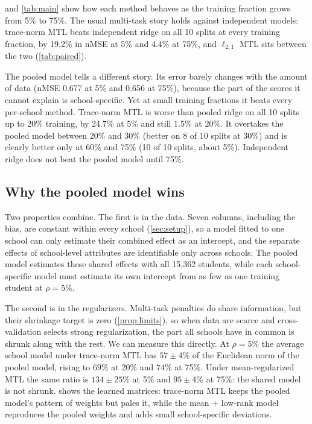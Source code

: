 


 and \cref{tab:main} show how each method behaves as the training fraction grows from 5\% to 75\%. The usual multi-task story holds against independent models: trace-norm MTL beats independent ridge on all 10 splits at every training fraction, by 19.2\% in nMSE at 5\% and 4.4\% at 75\%, and $\ell_{2,1}$ MTL sits between the two (\cref{tab:paired}).

The pooled model tells a different story. Its error barely changes with the amount of data (nMSE 0.677 at 5\% and 0.656 at 75\%), because the part of the scores it cannot explain is school-specific. Yet at small training fractions it beats every per-school method. Trace-norm MTL is worse than pooled ridge on all 10 splits up to 20\% training, by 24.7\% at 5\% and still 1.5\% at 20\%. It overtakes the pooled model between 20\% and 30\% (better on 8 of 10 splits at 30\%) and is clearly better only at 60\% and 75\% (10 of 10 splits, about 5\%). Independent ridge does not beat the pooled model until 75\%.

\subsection{Why the pooled model wins}
\label{sec:res-why}

Two properties combine. The first is in the data. Seven columns, including the bias, are constant within every school (\cref{sec:setup}), so a model fitted to one school can only estimate their combined effect as an intercept, and the separate effects of school-level attributes are identifiable only across schools. The pooled model estimates these shared effects with all 15,362 students, while each school-specific model must estimate its own intercept from as few as one training student at $\rho = 5\%$.

The second is in the regularizers. Multi-task penalties do share information, but their shrinkage target is zero (\cref{prop:limits}), so when data are scarce and cross-validation selects strong regularization, the part all schools have in common is shrunk along with the rest. We can measure this directly. At $\rho = 5\%$ the average school model under trace-norm MTL has $57 \pm 4\%$ of the Euclidean norm of the pooled model, rising to $69\%$ at 20\% and $74\%$ at 75\%. Under mean-regularized MTL the same ratio is $134 \pm 25\%$ at 5\% and $95 \pm 4\%$ at 75\%: the shared model is not shrunk.  shows the learned matrices: trace-norm MTL keeps the pooled model's pattern of weights but pales it, while the mean + low-rank model reproduces the pooled weights and adds small school-specific deviations.

